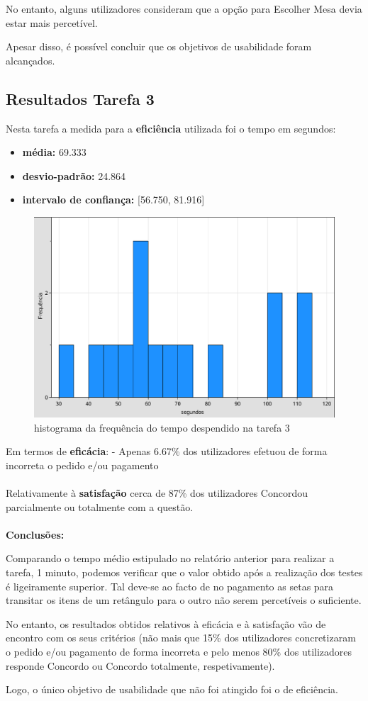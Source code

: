 \documentclass{article}
\begin{document}
No entanto, alguns utilizadores consideram que a opção para Escolher Mesa devia estar mais percetível.

Apesar disso, é possível concluir que os objetivos de usabilidade foram alcançados.

\subsection*{Resultados Tarefa 3}
Nesta tarefa a medida para a \textbf{eficiência} utilizada foi o tempo em segundos:
\begin{itemize}
\item\textbf{média:} 69.333 
\item\textbf{desvio-padrão:} 24.864
\item\textbf{intervalo de confiança:} [56.750, 81.916]
\end{itemize}
\begin{figure}[H]
\centering
\includegraphics[scale=0.35]{grafico3}
\caption{histograma da frequência do tempo despendido na tarefa 3}
\end{figure} Em termos de \textbf{eficácia}:
 - Apenas 6.67\% dos utilizadores efetuou de forma incorreta o pedido e/ou pagamento \\\\
Relativamente à \textbf{satisfação} cerca de 87\% dos utilizadores Concordou parcialmente ou totalmente com a questão.\\\\
\textbf{Conclusões:}

Comparando o tempo médio estipulado no relatório anterior para realizar a tarefa, 1 minuto, podemos verificar que o valor obtido após a realização dos testes é ligeiramente superior. Tal deve-se ao facto de no pagamento as setas para transitar os itens de um retângulo para o outro não serem percetíveis o suficiente.

No entanto, os resultados obtidos relativos à eficácia e à satisfação vão de encontro com os seus critérios (não mais que 15\% dos utilizadores concretizaram o pedido e/ou pagamento de forma incorreta e pelo menos 80\% dos utilizadores responde Concordo ou Concordo totalmente, respetivamente).

Logo, o único objetivo de usabilidade que não foi atingido foi o de eficiência.
\end{document}

